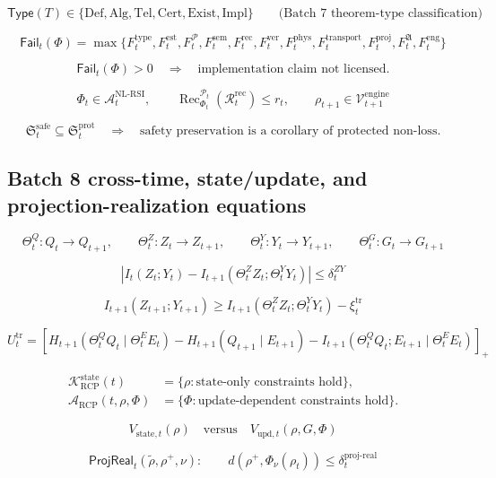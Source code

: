 \documentclass[11pt]{article}
\newcommand{\K}{\mathcal{K}}
\newcommand{\Acal}{\mathcal{A}}
\newcommand{\Pcal}{\mathcal{P}}
\newcommand{\Rcal}{\mathcal{R}}
\newcommand{\1}{\mathbf{1}}
\newcommand{\RCP}{\mathrm{RCP}}
\newcommand{\state}{\mathrm{state}}
\providecommand{\Vcal}{\mathcal{V}}
\providecommand{\sem}{\mathrm{sem}}
\providecommand{\phys}{\mathrm{phys}}
\providecommand{\ver}{\mathrm{ver}}
\providecommand{\Rec}{\operatorname{Rec}}
\providecommand{\upd}{\mathrm{upd}}
\providecommand{\proj}{\mathrm{proj}}
\providecommand{\real}{\mathrm{real}}
\begin{document}
\[
\mathsf{Type}(T)\in
\{\mathrm{Def},\mathrm{Alg},\mathrm{Tel},\mathrm{Cert},\mathrm{Exist},\mathrm{Impl}\}
\qquad
\text{(Batch 7 theorem-type classification)}
\]

\[
\mathsf{Fail}_t(\Phi)=
\max\{F_t^{\mathrm{type}},F_t^{\mathrm{est}},F_t^{\Pcal},F_t^{\sem},F_t^{\mathrm{rec}},F_t^{\ver},F_t^{\phys},F_t^{\mathrm{transport}},F_t^{\mathrm{proj}},F_t^{\mathfrak A},F_t^{\mathrm{eng}}\}
\]

\[
\mathsf{Fail}_t(\Phi)>0
\quad\Longrightarrow\quad
\text{implementation claim not licensed.}
\]

\[
\Phi_t\in\Acal_t^{\mathrm{NL\mbox{-}RSI}},
\qquad
\Rec_{\Phi_t}^{\Pcal_t}(\Rcal_t^{\mathrm{rec}})\le r_t,
\qquad
\rho_{t+1}\in\Vcal_{t+1}^{\mathrm{engine}}
\]

\[
\mathfrak S_t^{\mathrm{safe}}\subseteq \mathfrak S_t^{\mathrm{prot}}
\quad\Longrightarrow\quad
\text{safety preservation is a corollary of protected non-loss.}
\]


\subsection*{Batch 8 cross-time, state/update, and projection-realization equations}

\[
\Theta_t^Q:Q_t\to Q_{t+1},\qquad
\Theta_t^Z:Z_t\to Z_{t+1},\qquad
\Theta_t^Y:Y_t\to Y_{t+1},\qquad
\Theta_t^G:G_t\to G_{t+1}
\]

\[
\left|I_t(Z_t;Y_t)-I_{t+1}(\Theta_t^ZZ_t;\Theta_t^YY_t)\right|\le\delta_t^{ZY}
\]

\[
I_{t+1}(Z_{t+1};Y_{t+1})
\ge
I_{t+1}(\Theta_t^ZZ_t;\Theta_t^YY_t)-\xi_t^{\mathrm{tr}}
\]

\[
U_t^{\mathrm{tr}}
=
\left[
H_{t+1}(\Theta_t^QQ_t\mid\Theta_t^EE_t)
-
H_{t+1}(Q_{t+1}\mid E_{t+1})
-
I_{t+1}(\Theta_t^QQ_t;E_{t+1}\mid\Theta_t^EE_t)
\right]_+
\]

\[
\begin{aligned}
\K_{\RCP}^{\state}(t)
&=\{\rho:\text{state-only constraints hold}\},\\
\Acal_{\RCP}(t,\rho,\Phi)
&=\{\Phi:\text{update-dependent constraints hold}\}.
\end{aligned}
\]

\[
V_{\state,t}(\rho)\quad\text{versus}\quad V_{\upd,t}(\rho,G,\Phi)
\]

\[
\mathsf{ProjReal}_t(\tilde\rho,\rho^+,\nu):
\qquad
d(\rho^+,\Phi_\nu(\rho_t))\le\delta_t^{\proj\mbox{-}\real}
\]
\end{document}
